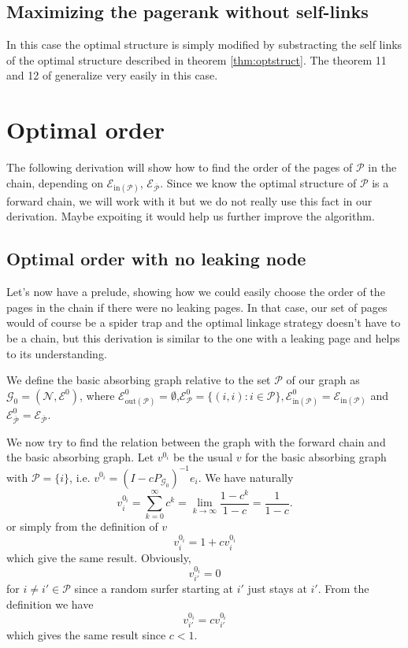 \documentclass{article}
\newcommand{\1}{\mathbf{1}}
\theoremstyle{definition}
\begin{document}
\subsection{Maximizing the pagerank without self-links}
In this case the optimal structure is simply modified by substracting the self links of the optimal structure described in theorem \ref{thm:optstruct}. The theorem 11 and 12 of \cite{de2008maximizing} generalize very easily in this case.


\section{Optimal order}
The following derivation will show how to find the order of the pages of $\mathcal{P}$ in the chain, depending
on $\mathcal{E}_{\text{in}(\mathcal{P})}$, $\mathcal{E}_{\overline{\mathcal{P}}}$.
Since we know the optimal structure of $\mathcal{P}$ is a forward chain, we will work with it but
we do not really use this fact in our derivation.
Maybe expoiting it would help us further improve the algorithm.

\subsection{Optimal order with no leaking node}
\label{sec:no_leak}
Let's now have a prelude, showing how we could easily choose the order of the pages in the chain if there were
no leaking pages.
In that case, our set of pages would of course be a spider trap and the optimal linkage strategy doesn't have to be a chain, but this derivation is similar
to the one with a leaking page and helps to its understanding.

We define the basic absorbing graph relative to the set \(\mathcal{P}\) of our graph as \(\mathcal{G}_0=(\mathcal{N},\mathcal{E}^0)\), where \(\mathcal{E}_{\text{out}(\mathcal{P})}^0 = \emptyset\),\(\mathcal{E}^0_{\mathcal{P}}=\{(i,i):i\in \mathcal{P}\},\mathcal{E}_{\text{in}(\mathcal{P})}^0 = \mathcal{E}_{\text{in}(\mathcal{P})}\) and \( \mathcal{E}^0_{\overline{\mathcal{P}}}=\mathcal{E}_{\overline{\mathcal{P}}}\).

We now try to find the relation between the graph with the forward chain and the basic absorbing graph.
Let \(v^{0_i}\) be the usual \(v\) for the basic absorbing graph with $\mathcal{P} = \{i\}$,
i.e. \(v^{0_i} = (I - cP_{\mathcal{G}_0})^{-1}e_i\).
We have naturally
\[ v_i^{0_i} = \sum_{k=0}^\infty c^k = \lim_{k \to \infty} \frac{1-c^k}{1-c} = \frac{1}{1-c}. \]
or simply from the definition of $v$
\[ v_i^{0_i} = 1 + c v_i^{0_i} \]
which give the same result.
Obviously,
\[ v_{i'}^{0_i} = 0 \]
for $i \neq i' \in \mathcal{P}$ since a random surfer starting at $i'$ just stays at $i'$.
From the definition we have
\[ v_{i'}^{0_i} = c v_{i'}^{0_i} \]
which gives the same result since \(c < 1\).
\end{document}
